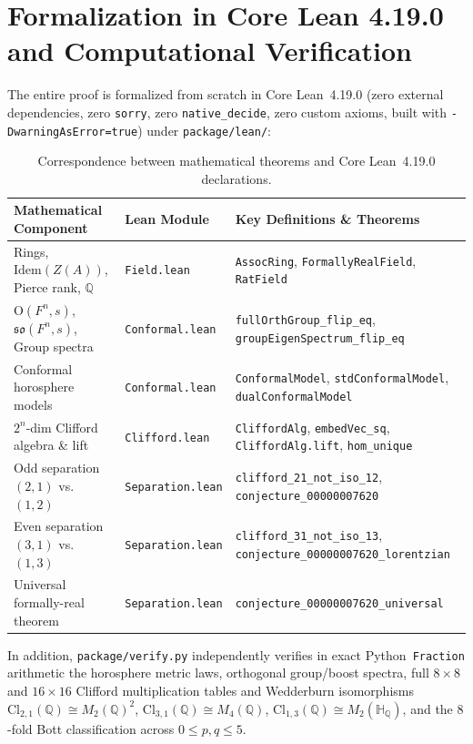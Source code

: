\documentclass[11pt]{article}
\theoremstyle{definition}
\newcommand{\Cl}{\mathrm{Cl}}
\newcommand{\Orth}{\mathrm{O}}
\newcommand{\so}{\mathfrak{so}}
\newcommand{\Idem}{\mathrm{Idem}}
\begin{document}
\section{Formalization in Core Lean 4.19.0 and Computational Verification}

The entire proof is formalized from scratch in Core Lean~4.19.0 (zero external dependencies, zero \texttt{sorry}, zero \texttt{native\_decide}, zero custom axioms, built with \texttt{-DwarningAsError=true}) under \texttt{package/lean/}:

\begin{table}[ht]
\centering
\footnotesize
\renewcommand{\arraystretch}{1.2}
\begin{tabular}{@{}p{}p{}>{\raggedright\arraybackslash}p{}@{}}
\toprule
Mathematical Component & Lean Module & Key Definitions \& Theorems \\
\midrule
Rings, $\Idem(Z(A))$, Pierce rank, $\mathbb{Q}$ & \texttt{Field.lean} & \texttt{AssocRing}, \texttt{FormallyRealField}, \texttt{RatField} \\
$\Orth(F^n, s)$, $\so(F^n, s)$, Group spectra & \texttt{Conformal.lean} & \texttt{fullOrthGroup\_flip\_eq}, \texttt{groupEigenSpectrum\_flip\_eq} \\
Conformal horosphere models & \texttt{Conformal.lean} & \texttt{ConformalModel}, \texttt{stdConformalModel}, \texttt{dualConformalModel} \\
$2^n$-dim Clifford algebra \& lift & \texttt{Clifford.lean} & \texttt{CliffordAlg}, \texttt{embedVec\_sq}, \texttt{CliffordAlg.lift}, \texttt{hom\_unique} \\
Odd separation $(2,1)$ vs.\ $(1,2)$ & \texttt{Separation.lean} & \texttt{clifford\_21\_not\_iso\_12}, \texttt{conjecture\_00000007620} \\
Even separation $(3,1)$ vs.\ $(1,3)$ & \texttt{Separation.lean} & \texttt{clifford\_31\_not\_iso\_13}, \texttt{conjecture\_00000007620\_lorentzian} \\
Universal formally-real theorem & \texttt{Separation.lean} & \texttt{conjecture\_00000007620\_universal} \\
\bottomrule
\end{tabular}
\caption{Correspondence between mathematical theorems and Core Lean~4.19.0 declarations.}
\end{table}

In addition, \texttt{package/verify.py} independently verifies in exact Python~\texttt{Fraction} arithmetic the horosphere metric laws, orthogonal group/boost spectra, full $8 \times 8$ and $16 \times 16$ Clifford multiplication tables and Wedderburn isomorphisms $\Cl_{2,1}(\mathbb{Q}) \cong M_2(\mathbb{Q})^2$, $\Cl_{3,1}(\mathbb{Q}) \cong M_4(\mathbb{Q})$, $\Cl_{1,3}(\mathbb{Q}) \cong M_2(\mathbb{H}_{\mathbb{Q}})$, and the $8$-fold Bott classification across $0 \le p, q \le 5$.
\end{document}
